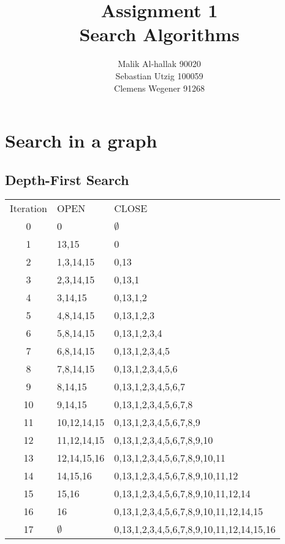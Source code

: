 \documentclass[11pt]{article}
\title{\textbf{Assignment 1\\}Search Algorithms}
\author{Malik Al-hallak 90020\\
		Sebastian Utzig 100059\\
		Clemens Wegener 91268}
\date{}
\begin{document}
\maketitle
\section{Search in a graph}
\subsection{Depth-First Search}
\begin{tabular}{ c | l | l }
  Iteration & OPEN & CLOSE \\
  0 	&	0				&	$\emptyset$ \\
  1		&	13,15			&	0\\
  2		&	1,3,14,15		&	0,13\\
  3		&	2,3,14,15		&	0,13,1\\
  4		&	3,14,15			&	0,13,1,2\\
  5		&	4,8,14,15		&	0,13,1,2,3\\
  6		&	5,8,14,15		&	0,13,1,2,3,4\\
  7		&	6,8,14,15		&	0,13,1,2,3,4,5\\
  8		&	7,8,14,15		&	0,13,1,2,3,4,5,6\\
  9		&	8,14,15			&	0,13,1,2,3,4,5,6,7\\
  10	&	9,14,15			&	0,13,1,2,3,4,5,6,7,8\\
  11	&	10,12,14,15		&	0,13,1,2,3,4,5,6,7,8,9\\
  12	&	11,12,14,15		&	0,13,1,2,3,4,5,6,7,8,9,10\\
  13	&	12,14,15,16		&	0,13,1,2,3,4,5,6,7,8,9,10,11\\
  14	&	14,15,16		&	0,13,1,2,3,4,5,6,7,8,9,10,11,12\\
  15	&	15,16			&	0,13,1,2,3,4,5,6,7,8,9,10,11,12,14\\
  16	&	16				&	0,13,1,2,3,4,5,6,7,8,9,10,11,12,14,15\\
  17	&	$\emptyset$		&	0,13,1,2,3,4,5,6,7,8,9,10,11,12,14,15,16
 \end{tabular}
\end{document}
